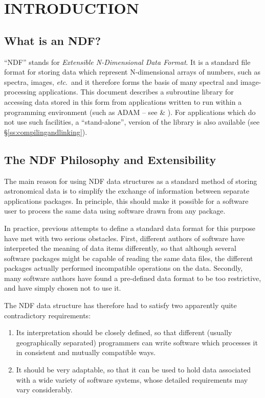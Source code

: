 \documentclass[twoside,11pt,nolof]{starlink}
\providecommand{\st}[1]{{\emph{#1}}}
\begin{document}
\scfrontmatter

\section{INTRODUCTION}

\subsection{What is an NDF?}

``NDF'' stands for \st{Extensible N-Dimensional Data Format}.  It is
a standard file format for storing data which represent N-dimensional
arrays of numbers, such as spectra, images, \st{etc}.\ and it
therefore forms the basis of many spectral and image-processing
applications.
This document describes a subroutine library for accessing data stored
in this form from applications written to run within a programming
environment (such as ADAM -- see  \&
).
For applications which do not use such facilities, a ``stand-alone'',
version of the library is also available (see
\S\ref{ss:compilingandlinking}).

\subsection{The NDF Philosophy and Extensibility}

The main reason for using NDF data structures as a standard method of
storing astronomical data is to simplify the exchange of information
between separate applications packages.  In principle, this should
make it possible for a software user to process the same data using
software drawn from any package.

In practice, previous attempts to define a standard data format for this
purpose have met with two serious obstacles.
First, different authors of software have interpreted the meaning of data
items differently, so that although several software packages might be
capable of reading the same data files, the different packages actually
performed incompatible operations on the data.
Secondly, many software authors have found a pre-defined data format to be
too restrictive, and have simply chosen not to use it.

The NDF data structure has therefore had to satisfy two apparently quite
contradictory requirements:

\begin{enumerate}

\item Its interpretation should be closely defined, so that different
(usually geographically separated) programmers can write software which
processes it in consistent and mutually compatible ways.

\item It should be very adaptable, so that it can be used to hold data
associated with a wide variety of software systems, whose detailed
requirements may vary considerably.

\end{enumerate}
\end{document}
